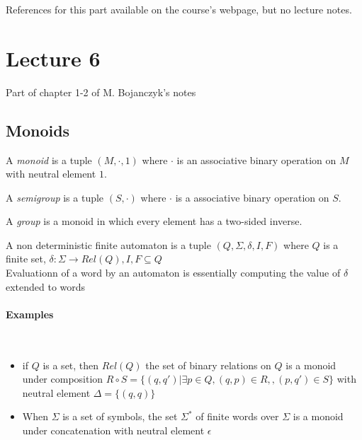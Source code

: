 
References for this part available on the course's webpage, but no lecture notes.

\section{Lecture 6} %
\label{sec:lecture_6}
Part of chapter 1-2 of M. Bojanczyk's notes

\subsection{Monoids} %
\label{sub:monoids}

\begin{definition}[Monoid]
	A \emph{monoid} is a tuple $(M, \cdot, 1)$ where $\cdot$ is an associative
	binary operation on $M$ with neutral element $1$.
\end{definition}

\begin{definition}[Semigroup]
	A \emph{semigroup} is a tuple $(S, \cdot)$ where $\cdot$ is a associative
	binary operation on $S$.
\end{definition}

\begin{definition}[Group]
	A \emph{group} is a monoid in which every element has a two-sided inverse.
\end{definition}

\begin{definition}
	A non deterministic finite automaton is a tuple
	$(Q, \Sigma, \delta, I, F)$ where $Q$ is a finite set, 
	$\delta : \Sigma \to Rel(Q), I, F \subseteq Q$\\
	Evaluationn of a word by an automaton is essentially
	computing the value of $\delta$ extended to words
\end{definition}

\paragraph{Examples}~
\begin{itemize}
	\item if $Q$ is a set, then $Rel(Q)$ the set of binary relations on $Q$ 
		is a monoid under composition $R \circ S = \{(q,q') | \exists p \in Q,
		(q,p) \in R,, (p, q') \in S \}$ with neutral element
		$\Delta = \{(q,q)\}$ 
	\item When  $\Sigma$ is a set of symbols, the set $\Sigma^*$ of finite
		words over $\Sigma$ is a monoid under concatenation with neutral
		element $\epsilon$
\end{itemize}

